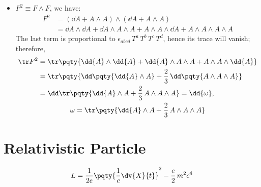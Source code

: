 \documentclass[a4paper,10pt]{article}
\begin{document}
\begin{itemize}
	\item $F^2\equiv F\wedge F$, we have:
	\begin{equation}
	\begin{aligned}
		F^2
		&= (\dd{A} + A\wedge A)
			\wedge (\dd{A} + A\wedge A) \\
		&= \dd{A} \wedge \dd{A}
			+ \dd{A} \wedge A \wedge A
			+ A \wedge A \wedge \dd{A}
			+ A \wedge A \wedge A \wedge A
	\end{aligned}
	\end{equation}
	The last term is proportional to $
		\epsilon_{abcd}\,T^a\,T^b\,T^c\,T^d
	$, hence its trace will vanish; therefore,
	\begin{gather}
	\begin{aligned}
		\tr F^2
		&= \tr \pqty{
			\dd{A} \wedge \dd{A}
			+ \dd{A} \wedge A \wedge A
			+ A \wedge A \wedge \dd{A}
		} \\
		&= \tr \pqty{
			\dd\pqty{\dd{A} \wedge A}
			+ \frac{2}{3}\,\dd\pqty{
				A \wedge A \wedge A
			}
		} \\
		&= \dd \tr \pqty{
			\dd{A} \wedge A
			+ \frac{2}{3}\,A \wedge A \wedge A
		} = \dd{\omega},
	\end{aligned}\\
		\omega = \tr \pqty{
			\dd{A} \wedge A
			+ \frac{2}{3}\,A \wedge A \wedge A
		}
	\end{gather}
	\vspace{-1.8\baselineskip}
	\end{itemize}
	\qedfull
	\vspace{-1\baselineskip}
\section{Relativistic Particle}
	\vspace{-.35\baselineskip}
	\begin{equation}
		L = \frac{1}{2e} \pqty{
			\frac{1}{c}\dv{X}{t}
		}^2 - \frac{e}{2}\,m^2 c^4
	\end{equation}
	
\end{document}
